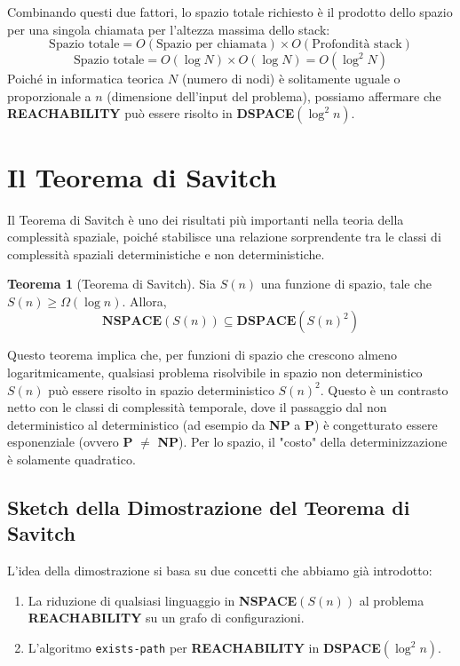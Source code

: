 \documentclass[a4paper]{article}
\theoremstyle{definition} %
\newtheorem{theorem}{Teorema}
\begin{document}
Combinando questi due fattori, lo spazio totale richiesto è il prodotto dello spazio per una singola chiamata per l'altezza massima dello stack:
\[ \text{Spazio totale} = O(\text{Spazio per chiamata}) \times O(\text{Profondità stack}) \]
\[ \text{Spazio totale} = O(\log N) \times O(\log N) = O(\log^2 N) \]
Poiché in informatica teorica $N$ (numero di nodi) è solitamente uguale o proporzionale a $n$ (dimensione dell'input del problema), possiamo affermare che \textbf{REACHABILITY} può essere risolto in \textbf{DSPACE}$(\log^2 n)$.

\section{Il Teorema di Savitch}
Il Teorema di Savitch è uno dei risultati più importanti nella teoria della complessità spaziale, poiché stabilisce una relazione sorprendente tra le classi di complessità spaziali deterministiche e non deterministiche.

\begin{theorem}[Teorema di Savitch]
Sia $S(n)$ una funzione di spazio, tale che $S(n) \geq \Omega(\log n)$. Allora,
\[ \mathbf{NSPACE}(S(n)) \subseteq \mathbf{DSPACE}(S(n)^2) \]
\end{theorem}

Questo teorema implica che, per funzioni di spazio che crescono almeno logaritmicamente, qualsiasi problema risolvibile in spazio non deterministico $S(n)$ può essere risolto in spazio deterministico $S(n)^2$. Questo è un contrasto netto con le classi di complessità temporale, dove il passaggio dal non deterministico al deterministico (ad esempio da \textbf{NP} a \textbf{P}) è congetturato essere esponenziale (ovvero \textbf{P} $\ne$ \textbf{NP}). Per lo spazio, il "costo" della determinizzazione è solamente quadratico.

\subsection{Sketch della Dimostrazione del Teorema di Savitch}
L'idea della dimostrazione si basa su due concetti che abbiamo già introdotto:
\begin{enumerate}
    \item La riduzione di qualsiasi linguaggio in \textbf{NSPACE}$(S(n))$ al problema \textbf{REACHABILITY} su un grafo di configurazioni.
    \item L'algoritmo \texttt{exists-path} per \textbf{REACHABILITY} in \textbf{DSPACE}$(\log^2 n)$.
\end{enumerate}
\end{document}
